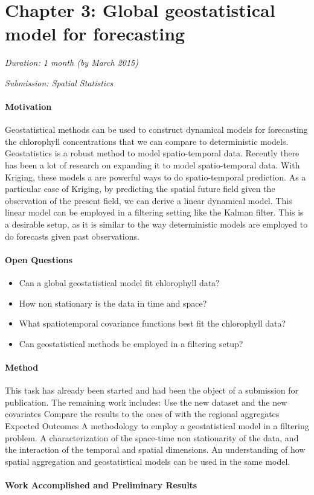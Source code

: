 \section{Chapter 3: Global geostatistical model for forecasting}

\noindent
\emph{Duration: 1 month (by March 2015)}

\noindent
\emph{Submission: Spatial Statistics}

\paragraph{Motivation}

Geostatistical methods can be used to construct dynamical models for forecasting the chlorophyll concentrations that we can compare to deterministic models. Geostatistics is a robust method to model spatio-temporal data. Recently there has been a lot of research on expanding it to model spatio-temporal data. With Kriging, these models a are powerful ways to do spatio-temporal prediction. As a particular case of Kriging, by predicting the spatial future field given the observation of the present field, we can derive a linear dynamical model. This linear model can be employed in a filtering setting like the Kalman filter. This is a desirable setup, as it is similar to the way deterministic models are employed to do forecasts given past observations. 

\paragraph{Open Questions}

\begin{itemize}
\item Can a global geostatistical model fit chlorophyll data?
\item How non stationary is the data in time and space?
\item What spatiotemporal covariance functions best fit the chlorophyll data?
\item Can geostatistical methods be employed in a filtering setup?
\end{itemize}

\paragraph{Method}

This task has already been started and had been the object of a submission for publication. The remaining work includes:
Use the new dataset and the new covariates
Compare the results to the ones of with the regional aggregates
Expected Outcomes
A methodology to employ a geostatistical model in a filtering problem.
A characterization of the space-time non stationarity of the data, and the interaction of the temporal and spatial dimensions.
An understanding of how spatial aggregation and geostatistical models can be used in the same model. 

\paragraph{Work Accomplished and Preliminary Results}


